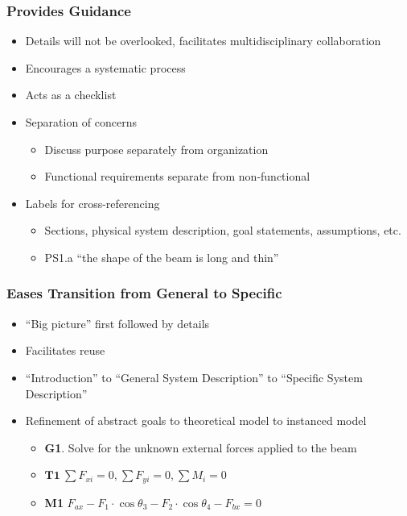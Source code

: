 \documentclass[t,12pt,numbers,fleqn]{beamer}
\begin{document}

\begin{frame}
\frametitle{Provides Guidance}
\begin{itemize}
\item Details will not be overlooked, facilitates multidisciplinary collaboration
\item Encourages a systematic process
\item Acts as a checklist
\item Separation of concerns
\begin{itemize}
\item Discuss purpose separately from organization
\item Functional requirements separate from non-functional
\end{itemize}
\item Labels for cross-referencing
\begin{itemize}
\item Sections, physical system description, goal statements, assumptions, etc.
\item PS1.a ``the shape of the beam is long and thin''
\end{itemize}
\end{itemize}
\end{frame}


\begin{frame}
\frametitle{Eases Transition from General to Specific}
\begin{itemize}
\item ``Big picture'' first followed by details
\item Facilitates reuse
\item ``Introduction'' to ``General System Description'' to ``Specific System Description''
\item Refinement of abstract goals to theoretical model to instanced model
\begin{itemize}
\item \textbf{G1}. Solve for the unknown external forces applied to the beam
\item $ \textbf{T1}~ 
\textrm{$\sum{F_{xi}} = 0$,}~  
\textrm{$\sum{F_{yi}} = 0$,}~
\textrm{$\sum{M_i} = 0$}$
\item \textbf{M1} \textrm{$F_{ax} - F_1\cdot \cos\theta_3 - F_2\cdot \cos\theta_4 - F_{bx} = 0$}
\end{itemize}
\end{itemize}
\end{frame}
\end{document}
